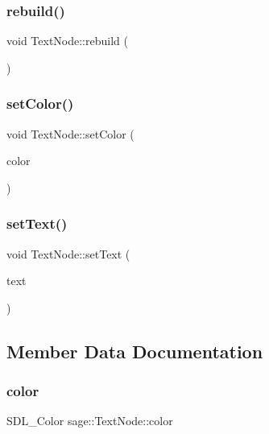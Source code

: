 \subsubsection{\texorpdfstring{rebuild()}{rebuild()}}
{\footnotesize\ttfamily void Text\+Node\+::rebuild (\begin{DoxyParamCaption}{ }\end{DoxyParamCaption})\hspace{0.3cm}{\ttfamily [protected]}}

\mbox{\label{classsage_1_1TextNode_a46a1738c681f158ab1d2468d3ec02a24}} 
\subsubsection{\texorpdfstring{setColor()}{setColor()}}
{\footnotesize\ttfamily void Text\+Node\+::set\+Color (\begin{DoxyParamCaption}\item[{S\+D\+L\+\_\+\+Color}]{color }\end{DoxyParamCaption})}

\mbox{\label{classsage_1_1TextNode_a81f9aa6c3c25d5b2b53904becad654fe}} 
\subsubsection{\texorpdfstring{setText()}{setText()}}
{\footnotesize\ttfamily void Text\+Node\+::set\+Text (\begin{DoxyParamCaption}\item[{const std\+::string \&}]{text }\end{DoxyParamCaption})}



\subsection{Member Data Documentation}
\mbox{\label{classsage_1_1TextNode_a08cbe2019a8aef4f1bd17a3f73a04d27}} 
\subsubsection{\texorpdfstring{color}{color}}
{\footnotesize\ttfamily S\+D\+L\+\_\+\+Color sage\+::\+Text\+Node\+::color\hspace{0.3cm}{\ttfamily [private]}}

